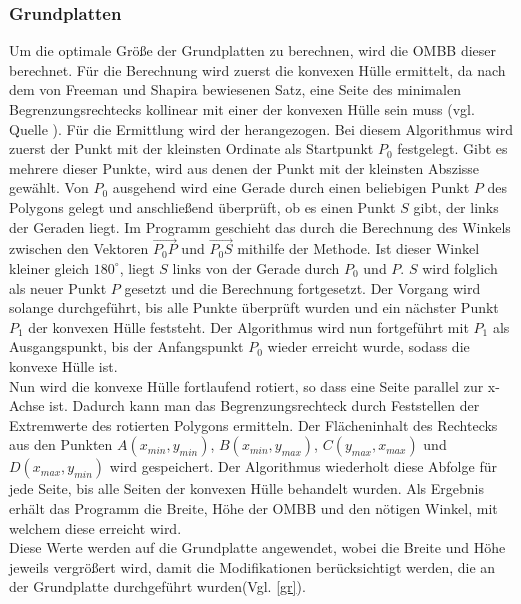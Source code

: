 \subsubsection{Grundplatten}
Um die optimale Größe der Grundplatten zu berechnen, wird die OMBB dieser berechnet.
Für die Berechnung wird zuerst die konvexen Hülle ermittelt, da nach dem von Freeman und Shapira bewiesenen Satz, eine Seite des minimalen Begrenzungsrechtecks kollinear mit einer der konvexen Hülle sein muss (vgl. Quelle \cite{ombb}).
Für die Ermittlung wird der  herangezogen.
Bei diesem Algorithmus wird zuerst der Punkt mit der kleinsten Ordinate als Startpunkt $P_0$ festgelegt.
Gibt es mehrere dieser Punkte, wird aus denen der Punkt mit der kleinsten Abszisse gewählt.
Von $P_0$ ausgehend wird eine Gerade durch einen beliebigen Punkt $P$ des Polygons gelegt und anschließend überprüft, ob es einen Punkt $S$ gibt, der links der Geraden liegt.
Im Programm geschieht das durch die Berechnung des Winkels zwischen den Vektoren $\overrightarrow{{P_0}P}$ und $\overrightarrow{{P_0}S}$ mithilfe der  Methode.
Ist dieser Winkel kleiner gleich $180^\circ$, liegt $S$ links von der Gerade durch $P_0$ und $P$.
$S$ wird folglich als neuer Punkt $P$ gesetzt und die Berechnung fortgesetzt.
Der Vorgang wird solange durchgeführt, bis alle Punkte überprüft wurden und ein nächster Punkt $P_1$ der konvexen Hülle feststeht.
Der Algorithmus wird nun fortgeführt mit $P_1$ als Ausgangspunkt, bis der Anfangspunkt $P_0$ wieder erreicht wurde, sodass die konvexe Hülle  ist.\\
Nun wird die konvexe Hülle fortlaufend rotiert, so dass eine Seite parallel zur x-Achse ist.
Dadurch kann man das Begrenzungsrechteck durch Feststellen der Extremwerte des rotierten Polygons ermitteln.
Der Flächeninhalt des Rechtecks aus den Punkten $A(x_{min}, y_{min})$, $B(x_{min}, y_{max})$, $C(y_{max}, x_{max})$ und $D(x_{max}, y_{min})$ wird gespeichert.
Der Algorithmus wiederholt diese Abfolge für jede Seite, bis alle Seiten der konvexen Hülle behandelt wurden. %
Als Ergebnis erhält das Programm die Breite, Höhe der OMBB und den nötigen Winkel, mit welchem diese erreicht wird.\\
Diese Werte werden auf die Grundplatte angewendet, wobei die Breite und Höhe jeweils vergrößert wird, damit die Modifikationen berücksichtigt werden, die an der Grundplatte durchgeführt wurden(Vgl. \ref{gr}).